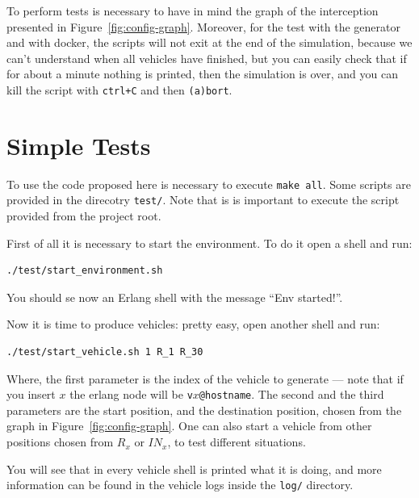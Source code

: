 \documentclass{memoir}
\begin{document}
To perform tests is necessary to have in mind the graph of the interception presented in Figure~\ref{fig:config-graph}. Moreover, for the test with the generator and with docker, the scripts will not exit at the end of the simulation, because we can't understand when all vehicles have finished, but you can easily check that if for about a minute nothing is printed, then the simulation is over, and you can kill the script with \verb|ctrl+C| and then \verb|(a)bort|.

\section{Simple Tests}
To use the code proposed here is necessary to execute \texttt{make all}. Some scripts are provided in the direcotry \texttt{test/}. Note that is is important to execute the script provided from the project root.

First of all it is necessary to start the environment. To do it open a shell and run:
\begin{verbatim}
./test/start_environment.sh
\end{verbatim}
You should se now an Erlang shell with the message ``Env started!''.

Now it is time to produce vehicles: pretty easy, open another shell and run:
\begin{verbatim}
./test/start_vehicle.sh 1 R_1 R_30
\end{verbatim}
Where, the first parameter is the index of the vehicle to generate --- note that if you insert $x$ the erlang node will be \verb|v|$x$\verb|@hostname|. The second and the third parameters are the start position, and the destination position, chosen from the graph in Figure~\ref{fig:config-graph}. One can also start a vehicle from other positions chosen from $R_x$ or $IN_x$, to test different situations.

You will see that in every vehicle shell is printed what it is doing, and more information can be found in the vehicle logs inside the \texttt{log/} directory.
\end{document}
